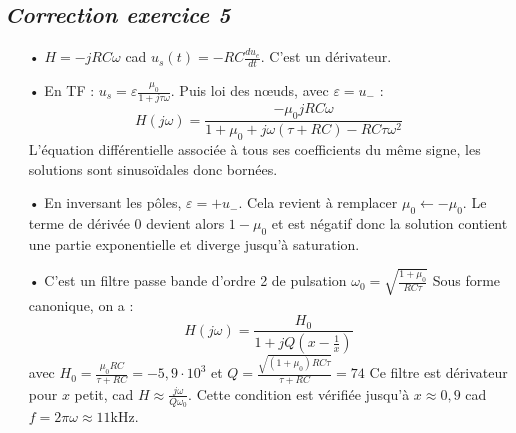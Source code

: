 \documentclass{report}
\begin{document}
\newpage

\subsection*{\textit{Correction exercice 5}}

\begin{itemize}
	\item[•] $H = -jRC\omega$ cad $u_s(t) = -RC\frac{du_e}{dt}$. C'est un dérivateur.
	\item[•] En TF : $u_s = \varepsilon\frac{\mu_0}{1+j\tau\omega}$. Puis loi des nœuds, avec $\varepsilon=u_-$ :
	\begin{equation}
		H(j\omega) = \frac{-\mu_0jRC\omega}{1+\mu_0 + j\omega(\tau+RC)-RC\tau\omega^2}
	\end{equation}
	L'équation différentielle associée à tous ses coefficients du même signe, les solutions sont sinusoïdales donc bornées. 
	\item[•] En inversant les pôles, $\varepsilon=+u_-$. Cela revient à remplacer $\mu_0\leftarrow-\mu_0$. Le terme de dérivée 0 devient alors $1-\mu_0$ et est négatif donc la solution contient une partie exponentielle et diverge jusqu'à saturation.
	\item[•] C'est un filtre passe bande d'ordre 2 de pulsation $\omega_0=\sqrt{\frac{1+\mu_0}{RC\tau}}$
	Sous forme canonique, on a :
		\begin{equation}
		H(j\omega) = \frac{H_0}{1+jQ(x-\frac{1}{x})}
	\end{equation}
	avec $H_0=\frac{\mu_0RC}{\tau+RC}=-5,9\cdot10^3$ et $Q = \frac{\sqrt{(1+\mu_0)RC\tau}}{\tau+RC}=74$
	Ce filtre est dérivateur pour $x$ petit, cad $H\approx \frac{j\omega}{Q\omega_0}$. Cette condition est vérifiée jusqu'à $x\approx0,9$ cad $f=2\pi\omega\approx11$kHz.
\end{itemize}
\end{document}
